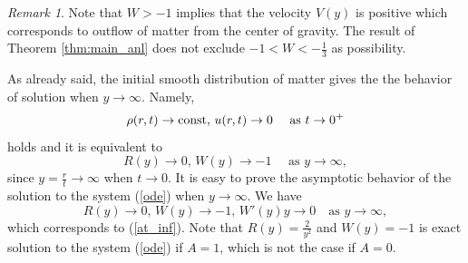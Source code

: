 \documentclass[reqno]{article}%
\theoremstyle{plain}
\theoremstyle{definition}
\theoremstyle{remark}
\newtheorem{remark}{Remark}[section]
\numberwithin{equation}{section}
\begin{document}
\medskip

\begin{remark}
Note that $W>-1$ implies that the velocity $V(y)$ is positive which corresponds to outflow of matter  from the center of gravity. The result of Theorem \ref{thm:main_anl} does not exclude $-1<W<-\frac{1}{3}$ as possibility. %
\end{remark}

\medskip

As already said, the initial  smooth distribution of matter gives the the behavior of solution when $y\to \infty$. Namely,
\[\rho(r,t)\to {\rm const},\, u(r,t)\to 0\quad \text{ as } t\to 0^+\]
holds and it is equivalent to
\begin{equation}\label{at_inf}
R(y)\to 0, \, W(y)\to -1 \quad \text{ as } y\to \infty,
\end{equation}
since $y=\frac{r}{t}\to \infty$ when $t\to 0.$  
It is easy to prove the asymptotic behavior of the  solution to the  system (\ref{ode}) when $y\to \infty$. We have
\begin{equation}\label{assym_inf}
R(y)\to 0,\, W(y)\to -1,\, W'(y)y\to 0 \quad \text{as } y\to \infty,
\end{equation}
which corresponds to (\ref{at_inf}).  Note that $R(y)=\frac{2}{y^2}$ and $W(y)=-1$ is exact solution to the system (\ref{ode}) if $A=1$, which is not the case if $A=0$.


\end{document}
